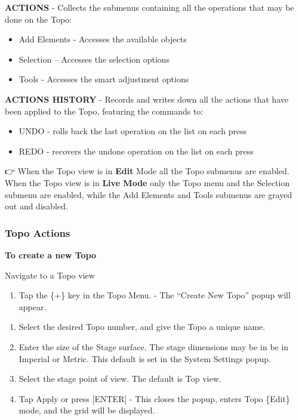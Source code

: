 \documentclass[
]{article}
\providecommand{\tightlist}{%
  \setlength{\itemsep}{0pt}\setlength{\parskip}{0pt}}
\begin{document}
\textbf{ACTIONS} - Collects the submenus containing all the operations that may be done on the Topo:

\begin{itemize}
\item
  Add Elements - Accesses the available objects
\item
  Selection -- Accesses the selection options
\item
  Tools - Accesses the smart adjustment options
\end{itemize}

\textbf{ACTIONS HISTORY} - Records and writes down all the actions that have been applied to the Topo, featuring the commands to:

\begin{itemize}
\item
  UNDO - rolls back the last operation on the list on each press
\item
  REDO - recovers the undone operation on the list on each press
\end{itemize}

👉 When the Topo view is in \textbf{Edit} Mode all the Topo submenus are enabled. When the Topo view is in \textbf{Live Mode} only the Topo menu and the Selection submenu are enabled, while the Add Elements and Tools submenus are grayed out and disabled.

\hypertarget{topo-actions}{%
\subsubsection{Topo Actions}\label{topo-actions}}

\textbf{To create a new Topo}

Navigate to a Topo view

\begin{enumerate}
\def\labelenumi{\arabic{enumi}.}
\tightlist
\item
  Tap the \{+\} key in the Topo Menu. - The ``Create New Topo'' popup will appear.
\end{enumerate}

\begin{enumerate}
\def\labelenumi{\arabic{enumi}.}
\setcounter{enumi}{1}
\item
  Select the desired Topo number, and give the Topo a unique name.
\item
  Enter the size of the Stage surface. The stage dimensions may be in be in Imperial or Metric. This default is set in the System Settings popup.
\item
  Select the stage point of view. The default is Top view.
\item
  Tap Apply or press {[}ENTER{]} - This closes the popup, enters Topo \{Edit\} mode, and the grid will be displayed.
\end{enumerate}
\end{document}
